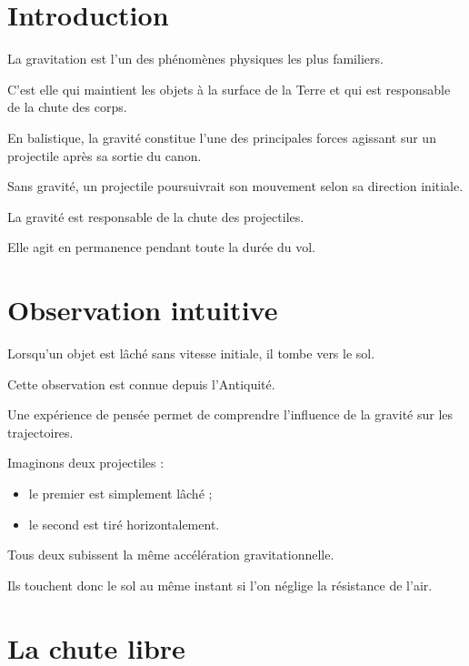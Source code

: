 
\section{Introduction}

La gravitation est l'un des phénomènes physiques les plus familiers.

C'est elle qui maintient les objets à la surface de la Terre et qui est
responsable de la chute des corps.

En balistique, la gravité constitue l'une des principales forces agissant sur
un projectile après sa sortie du canon.

Sans gravité, un projectile poursuivrait son mouvement selon sa direction
initiale.

\begin{aretenir}

La gravité est responsable de la chute des projectiles.

Elle agit en permanence pendant toute la durée du vol.

\end{aretenir}

\section{Observation intuitive}

Lorsqu'un objet est lâché sans vitesse initiale, il tombe vers le sol.

Cette observation est connue depuis l'Antiquité.

Une expérience de pensée permet de comprendre l'influence de la gravité sur
les trajectoires.

Imaginons deux projectiles :

\begin{itemize}
\item le premier est simplement lâché ;
\item le second est tiré horizontalement.
\end{itemize}

Tous deux subissent la même accélération gravitationnelle.

Ils touchent donc le sol au même instant si l'on néglige la résistance de
l'air.

\section{La chute libre}

